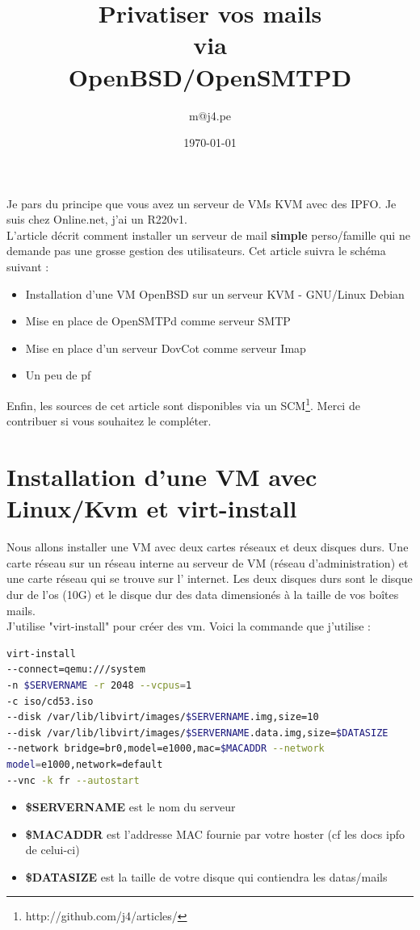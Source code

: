 \documentclass[a4paper,11pt]{article}
\title{Privatiser vos mails\\via\\OpenBSD/OpenSMTPD}
\author{m@j4.pe}
\date{\today}
\begin{document}
\maketitle

\abstract 

Je pars du principe que vous avez un serveur de VMs KVM avec des IPFO. Je suis
chez Online.net, j'ai un R220v1.\\
L'article décrit comment installer un serveur de mail {\bf simple} perso/famille 
qui ne demande pas une grosse gestion des utilisateurs.
Cet article suivra le schéma suivant :\\
\begin{itemize}
	\item Installation d'une VM OpenBSD sur un serveur KVM - GNU/Linux Debian
	\item Mise en place de OpenSMTPd comme serveur SMTP
	\item Mise en place d'un serveur DovCot comme serveur Imap
	\item Un peu de pf
\end{itemize} 
\vspace{5mm}
Enfin, les sources de cet article sont disponibles via un SCM\footnote{http://github.com/j4/articles/}. 
Merci de contribuer si vous souhaitez le compléter.

\section*{Installation d'une VM avec Linux/Kvm et virt-install}

Nous allons installer une VM avec deux cartes réseaux et deux disques durs. Une
carte réseau sur un réseau interne au serveur de VM (réseau d'administration)
et une carte réseau qui se trouve sur l' internet. Les deux disques durs sont
le disque dur de l'os (10G) et le disque dur des data dimensionés à la taille
de vos boîtes mails.\\
J'utilise "virt-install" pour créer des vm. Voici la commande que j'utilise :

\vspace{5mm}
\begin{lstlisting}[language=bash,caption={Création d'une VM OpenBSD avec KVM},frame=bt,breaklines=true]
virt-install 
--connect=qemu:///system 
-n $SERVERNAME -r 2048 --vcpus=1 
-c iso/cd53.iso 
--disk /var/lib/libvirt/images/$SERVERNAME.img,size=10 
--disk /var/lib/libvirt/images/$SERVERNAME.data.img,size=$DATASIZE 
--network bridge=br0,model=e1000,mac=$MACADDR --network 
model=e1000,network=default 
--vnc -k fr --autostart
\end{lstlisting}
\vspace{5mm}
\begin{itemize}
	\item {\bf \$SERVERNAME} est le nom du serveur
	\item {\bf \$MACADDR} est l'addresse MAC fournie par votre hoster (cf les docs ipfo de
celui-ci)
	\item {\bf \$DATASIZE} est la taille de votre disque qui contiendra les datas/mails
\end{itemize}
\end{document}
